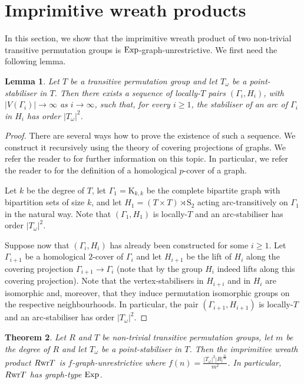 \documentclass{amsart}
\newtheorem{theorem}{Theorem}
\newtheorem{lemma}[theorem]{Lemma}
\theoremstyle{definition}
\begin{document}
\section{Imprimitive wreath products}
\label{sec:wreath}
In this section, we show that the imprimitive wreath product of two non-trivial transitive permutation groups is ${\mathop{\rm Exp}}$-graph-unrestrictive. We first need the following lemma.

\begin{lemma}
\label{homologicalLemma}
Let $T$ be a transitive permutation group and let $T_\omega$ be a point-stabiliser in $T$. Then there exists a sequence of locally-$T$ pairs $(\Gamma_i,H_i)$, with
$|V(\Gamma_i)| \to \infty$ as $i\to \infty$,
such that, for every $i\geq 1$, the stabiliser of an arc of $\Gamma_i$ in $H_i$ has order $|T_\omega|^2$. 
\end{lemma}
\begin{proof}
There are several ways how to prove the existence of such a sequence. We construct it recursively using the theory of covering projections of graphs. We refer the reader to \cite{MMP} for further information on this topic. In particular, we refer the reader to \cite[Section 6]{MMP} for the definition of a homological $p$-cover of a graph.

Let $k$ be the degree of $T$, let $\Gamma_1 = {\mathrm K}_{k,k}$ be the complete bipartite graph with bipartition sets of size $k$, and let $H_1 = (T\times T) \rtimes{\mathrm{S}}_2$ acting arc-transitively on $\Gamma_1$ in the natural way. Note that $(\Gamma_1,H_1)$ is locally-$T$ and an arc-stabiliser has order $|T_\omega|^2$.

Suppose now that $(\Gamma_i,H_i)$ has already been constructed for some $i\geq 1$. Let $\Gamma_{i+1}$ be a homological $2$-cover of $\Gamma_i$ and let $H_{i+1}$ be the lift of $H_i$ along the covering projection $\Gamma_{i+1} \to \Gamma_i$ (note that by \cite[Proposition 6.4]{MMP} the group $H_i$ indeed lifts along this covering projection). Note that the vertex-stabilisers in $H_{i+i}$ and in $H_i$ are isomorphic and, moreover, that they induce permutation isomorphic groups on the respective neighbourhoods. In particular,
 the pair $(\Gamma_{i+1}, H_{i+1})$ is locally-$T$ and an arc-stabiliser has order $|T_\omega|^2$.
 \end{proof}

\begin{theorem}
\label{thm:wreath}
Let $R$ and $T$ be non-trivial transitive permutation groups, let $m$ be the degree of $R$ and let $T_\omega$ be a point-stabiliser in $T$. Then the imprimitive wreath product $R {\mathop{\rm wr}} T$ is $f$-graph-unrestrictive where $f(n) =\frac{|T_\omega|^2|R|^{\frac{n}{m}}}{m^2} $. In particular, $R {\mathop{\rm wr}} T$ has graph-type ${\mathop{\rm Exp}}$.
\end{theorem}
\end{document}
